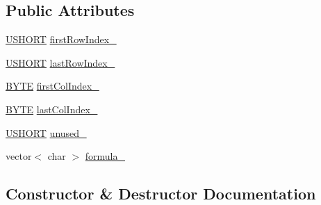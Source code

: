 \subsection*{Public Attributes}
\begin{DoxyCompactItemize}
\item 
\hyperlink{_basic_excel_8hpp_a5850d5316caf7f4cedd742fdf8cd7c02}{U\+S\+H\+O\+R\+T} \hyperlink{struct_y_excel_1_1_worksheet_1_1_cell_table_1_1_row_block_1_1_cell_block_1_1_formula_1_1_shr_fmla_a0cf02b776067305a675a4ec0b4af68e8}{first\+Row\+Index\+\_\+}
\item 
\hyperlink{_basic_excel_8hpp_a5850d5316caf7f4cedd742fdf8cd7c02}{U\+S\+H\+O\+R\+T} \hyperlink{struct_y_excel_1_1_worksheet_1_1_cell_table_1_1_row_block_1_1_cell_block_1_1_formula_1_1_shr_fmla_a34b90b2a40bf3f32884bd1c9b5dc13ad}{last\+Row\+Index\+\_\+}
\item 
\hyperlink{_basic_excel_8hpp_a4ae1dab0fb4b072a66584546209e7d58}{B\+Y\+T\+E} \hyperlink{struct_y_excel_1_1_worksheet_1_1_cell_table_1_1_row_block_1_1_cell_block_1_1_formula_1_1_shr_fmla_a9cac7ea3db4eb8120eb29c0f87ec7afa}{first\+Col\+Index\+\_\+}
\item 
\hyperlink{_basic_excel_8hpp_a4ae1dab0fb4b072a66584546209e7d58}{B\+Y\+T\+E} \hyperlink{struct_y_excel_1_1_worksheet_1_1_cell_table_1_1_row_block_1_1_cell_block_1_1_formula_1_1_shr_fmla_ab57c446d8ae42589040a7534a7bc67bd}{last\+Col\+Index\+\_\+}
\item 
\hyperlink{_basic_excel_8hpp_a5850d5316caf7f4cedd742fdf8cd7c02}{U\+S\+H\+O\+R\+T} \hyperlink{struct_y_excel_1_1_worksheet_1_1_cell_table_1_1_row_block_1_1_cell_block_1_1_formula_1_1_shr_fmla_aea066d45fc787fd98fb22e140d3d66eb}{unused\+\_\+}
\item 
vector$<$ char $>$ \hyperlink{struct_y_excel_1_1_worksheet_1_1_cell_table_1_1_row_block_1_1_cell_block_1_1_formula_1_1_shr_fmla_aea8726c322f6fa60c60cdfbe0bad4137}{formula\+\_\+}
\end{DoxyCompactItemize}


\subsection{Constructor \& Destructor Documentation}
\hypertarget{struct_y_excel_1_1_worksheet_1_1_cell_table_1_1_row_block_1_1_cell_block_1_1_formula_1_1_shr_fmla_aada7ef5968d20b51d9dfd68f9285aca4}{}

